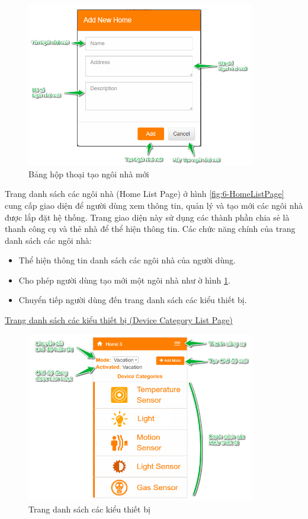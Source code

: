 \documentclass[12pt,a4paper,oneside]{extbook}
\begin{document}
\begin{figure}[h!]
  \centering
     \includegraphics[width=10cm]{6-AddHome}
  \caption{Bảng hộp thoại tạo ngôi nhà mới}\label{fig:6-AddHome}
\end{figure}

\noindent
Trang danh sách các ngôi nhà (Home List Page) ở hình \ref{fig:6-HomeListPage} cung cấp giao diện để người dùng xem thông tin, quản lý và tạo mới các ngôi nhà được lắp đặt hệ thống. Trang giao diện này sử dụng các thành phần chia sẻ là thanh công cụ và thẻ nhà để thể hiện thông tin. Các chức năng chính của trang danh sách các ngôi nhà:

\begin{itemize}[topsep=1mm,itemsep=-0.5mm]
\item Thể hiện thông tin danh sách các ngôi nhà của người dùng.
\item Cho phép người dùng tạo mới một ngôi nhà như ờ hình \ref{fig:6-AddHome}.
\item Chuyển tiếp người dùng đến trang danh sách các kiểu thiết bị.
\vspace{1mm}
\end{itemize}

\noindent
\underline{Trang danh sách các kiểu thiết bị (Device Category List Page)}

\begin{figure}[h]
  \centering
     \includegraphics[width=10cm]{6-DeviceCategoryList}
  \caption{Trang danh sách các kiểu thiết bị}\label{fig:6-DeviceCategoryList}
\end{figure}
\end{document}
